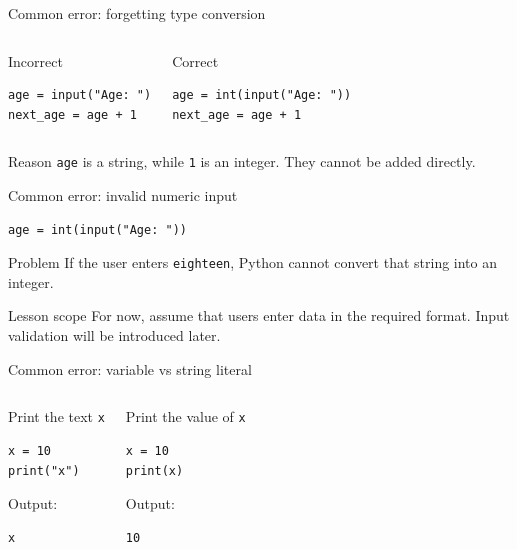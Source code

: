 \documentclass[aspectratio=169,10pt]{beamer}
\begin{document}
\begin{frame}[fragile]{Common error: forgetting type conversion}
\begin{columns}[T,onlytextwidth]
\begin{alertblock}{Incorrect}
\begin{lstlisting}
age = input("Age: ")
next_age = age + 1
\end{lstlisting}
\end{alertblock}
\begin{exampleblock}{Correct}
\begin{lstlisting}
age = int(input("Age: "))
next_age = age + 1
\end{lstlisting}
\end{exampleblock}
\end{columns}
\vspace{0.25cm}
\begin{block}{Reason}
\texttt{age} is a string, while \texttt{1} is an integer. They cannot be added directly.
\end{block}
\end{frame}

\begin{frame}[fragile]{Common error: invalid numeric input}
\begin{lstlisting}
age = int(input("Age: "))
\end{lstlisting}
\begin{block}{Problem}
If the user enters \texttt{eighteen}, Python cannot convert that string into an integer.
\end{block}
\begin{alertblock}{Lesson scope}
For now, assume that users enter data in the required format. Input validation will be introduced later.
\end{alertblock}
\end{frame}

\begin{frame}[fragile]{Common error: variable vs string literal}
\begin{columns}[T,onlytextwidth]
\begin{block}{Print the text \texttt{x}}
\begin{lstlisting}
x = 10
print("x")
\end{lstlisting}
Output:
\begin{verbatim}
x
\end{verbatim}
\end{block}
\begin{block}{Print the value of \texttt{x}}
\begin{lstlisting}
x = 10
print(x)
\end{lstlisting}
Output:
\begin{verbatim}
10
\end{verbatim}
\end{block}
\end{columns}
\end{frame}
\end{document}
